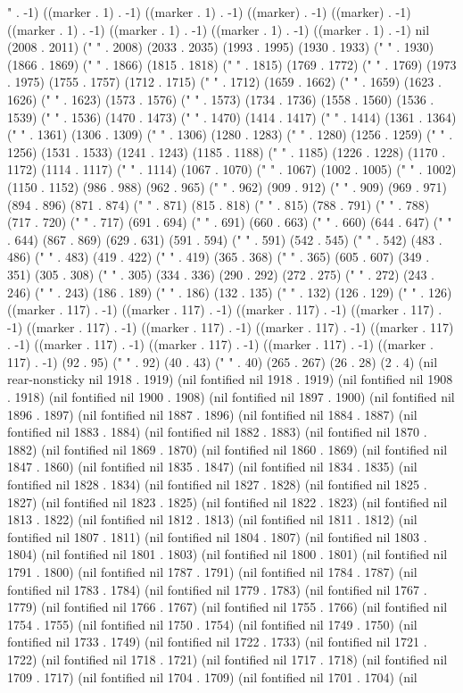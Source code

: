 " . -1) ((marker . 1) . -1) ((marker . 1) . -1) ((marker) . -1) ((marker) . -1) ((marker . 1) . -1) ((marker . 1) . -1) ((marker . 1) . -1) ((marker . 1) . -1) nil (2008 . 2011) (" " . 2008) (2033 . 2035) (1993 . 1995) (1930 . 1933) (" " . 1930) (1866 . 1869) (" " . 1866) (1815 . 1818) (" " . 1815) (1769 . 1772) (" " . 1769) (1973 . 1975) (1755 . 1757) (1712 . 1715) (" " . 1712) (1659 . 1662) (" " . 1659) (1623 . 1626) (" " . 1623) (1573 . 1576) (" " . 1573) (1734 . 1736) (1558 . 1560) (1536 . 1539) (" " . 1536) (1470 . 1473) (" " . 1470) (1414 . 1417) (" " . 1414) (1361 . 1364) (" " . 1361) (1306 . 1309) (" " . 1306) (1280 . 1283) (" " . 1280) (1256 . 1259) (" " . 1256) (1531 . 1533) (1241 . 1243) (1185 . 1188) (" " . 1185) (1226 . 1228) (1170 . 1172) (1114 . 1117) (" " . 1114) (1067 . 1070) (" " . 1067) (1002 . 1005) (" " . 1002) (1150 . 1152) (986 . 988) (962 . 965) (" " . 962) (909 . 912) (" " . 909) (969 . 971) (894 . 896) (871 . 874) (" " . 871) (815 . 818) (" " . 815) (788 . 791) (" " . 788) (717 . 720) (" " . 717) (691 . 694) (" " . 691) (660 . 663) (" " . 660) (644 . 647) (" " . 644) (867 . 869) (629 . 631) (591 . 594) (" " . 591) (542 . 545) (" " . 542) (483 . 486) (" " . 483) (419 . 422) (" " . 419) (365 . 368) (" " . 365) (605 . 607) (349 . 351) (305 . 308) (" " . 305) (334 . 336) (290 . 292) (272 . 275) (" " . 272) (243 . 246) (" " . 243) (186 . 189) (" " . 186) (132 . 135) ("  " . 132) (126 . 129) (" " . 126) ((marker . 117) . -1) ((marker . 117) . -1) ((marker . 117) . -1) ((marker . 117) . -1) ((marker . 117) . -1) ((marker . 117) . -1) ((marker . 117) . -1) ((marker . 117) . -1) ((marker . 117) . -1) ((marker . 117) . -1) ((marker . 117) . -1) ((marker . 117) . -1) (92 . 95) (" " . 92) (40 . 43) (" " . 40) (265 . 267) (26 . 28) (2 . 4) (nil rear-nonsticky nil 1918 . 1919) (nil fontified nil 1918 . 1919) (nil fontified nil 1908 . 1918) (nil fontified nil 1900 . 1908) (nil fontified nil 1897 . 1900) (nil fontified nil 1896 . 1897) (nil fontified nil 1887 . 1896) (nil fontified nil 1884 . 1887) (nil fontified nil 1883 . 1884) (nil fontified nil 1882 . 1883) (nil fontified nil 1870 . 1882) (nil fontified nil 1869 . 1870) (nil fontified nil 1860 . 1869) (nil fontified nil 1847 . 1860) (nil fontified nil 1835 . 1847) (nil fontified nil 1834 . 1835) (nil fontified nil 1828 . 1834) (nil fontified nil 1827 . 1828) (nil fontified nil 1825 . 1827) (nil fontified nil 1823 . 1825) (nil fontified nil 1822 . 1823) (nil fontified nil 1813 . 1822) (nil fontified nil 1812 . 1813) (nil fontified nil 1811 . 1812) (nil fontified nil 1807 . 1811) (nil fontified nil 1804 . 1807) (nil fontified nil 1803 . 1804) (nil fontified nil 1801 . 1803) (nil fontified nil 1800 . 1801) (nil fontified nil 1791 . 1800) (nil fontified nil 1787 . 1791) (nil fontified nil 1784 . 1787) (nil fontified nil 1783 . 1784) (nil fontified nil 1779 . 1783) (nil fontified nil 1767 . 1779) (nil fontified nil 1766 . 1767) (nil fontified nil 1755 . 1766) (nil fontified nil 1754 . 1755) (nil fontified nil 1750 . 1754) (nil fontified nil 1749 . 1750) (nil fontified nil 1733 . 1749) (nil fontified nil 1722 . 1733) (nil fontified nil 1721 . 1722) (nil fontified nil 1718 . 1721) (nil fontified nil 1717 . 1718) (nil fontified nil 1709 . 1717) (nil fontified nil 1704 . 1709) (nil fontified nil 1701 . 1704) (nil 